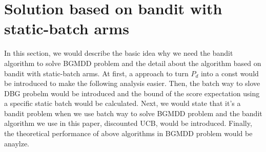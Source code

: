 \section{Solution based on bandit with static-batch arms }
\label{sec:alg}
\par In this section, we would describe the basic idea why we need the bandit algorithm to solve BGMDD problem and the detail about the algorithm based on bandit with static-batch arms. At first, a approach to turn $P_d$ into a const would be introduced to make the following analysis easier.  Then, the batch way to slove DBG probelm would be introduced and the bound of the score expectation using a specific static batch would be calculated. Next, we would state that it's a bandit problem when we use batch way to solve BGMDD problem and the bandit algorithm we use in this paper, discounted UCB, would be introduced. Finally, the theoretical performance of above algorithms in BGMDD problem would be anaylze.
